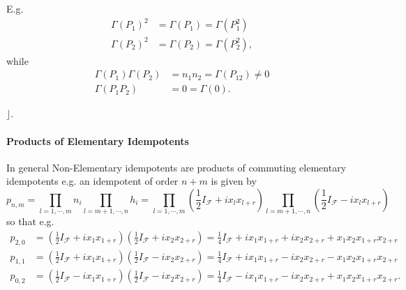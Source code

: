 \documentclass[aps,preprint]{revtex4}%
\begin{document}
E.g.
\begin{align}
\Gamma\left(  P_{1}\right)  ^{2}  &  =\Gamma\left(  P_{1}\right)
=\Gamma\left(  P_{1}^{2}\right) \\
\Gamma\left(  P_{2}\right)  ^{2}  &  =\Gamma\left(  P_{2}\right)
=\Gamma\left(  P_{2}^{2}\right)  ,
\end{align}
while
\begin{align}
\Gamma\left(  P_{1}\right)  \Gamma\left(  P_{2}\right)   &  =n_{1}n_{2}%
=\Gamma\left(  P_{12}\right)  \neq0\\
\Gamma\left(  P_{1}P_{2}\right)   &  =0=\Gamma\left(  0\right)  .
\end{align}


$\rfloor.$

\paragraph{Products of Elementary Idempotents}

In general Non-Elementary idempotents are products of commuting elementary
idempotents e.g. an idempotent of order $n+m$ is given by
\begin{equation}
p_{n,m}=%
{\displaystyle\prod\limits_{l=1,\cdots,m}}
n_{i}%
{\displaystyle\prod\limits_{l=m+1,\cdots,n}}
h_{i}=%
{\displaystyle\prod\limits_{l=1,\cdots,m}}
\left(  \frac{1}{2}I_{\mathcal{F}}+ix_{l}x_{l+r}\right)
{\displaystyle\prod\limits_{l=m+1,\cdots,n}}
\left(  \frac{1}{2}I_{\mathcal{F}}-ix_{l}x_{l+r}\right)
\end{equation}
so that e.g.
\begin{align}
p_{2,0}  &  =\left(  \frac{1}{2}I_{\mathcal{F}}+ix_{1}x_{1+r}\right)  \left(
\frac{1}{2}I_{\mathcal{F}}+ix_{2}x_{2+r}\right)  =\frac{1}{4}I_{\mathcal{F}%
}+ix_{1}x_{1+r}+ix_{2}x_{2+r}+x_{1}x_{2}x_{1+r}x_{2+r}\\
p_{1,1}  &  =\left(  \frac{1}{2}I_{\mathcal{F}}+ix_{1}x_{1+r}\right)  \left(
\frac{1}{2}I_{\mathcal{F}}-ix_{2}x_{2+r}\right)  =\frac{1}{4}I_{\mathcal{F}%
}+ix_{1}x_{1+r}-ix_{2}x_{2+r}-x_{1}x_{2}x_{1+r}x_{2+r}\\
p_{0,2}  &  =\left(  \frac{1}{2}I_{\mathcal{F}}-ix_{1}x_{1+r}\right)  \left(
\frac{1}{2}I_{\mathcal{F}}-ix_{2}x_{2+r}\right)  =\frac{1}{4}I_{\mathcal{F}%
}-ix_{1}x_{1+r}-ix_{2}x_{2+r}+x_{1}x_{2}x_{1+r}x_{2+r}.
\end{align}
\end{document}
